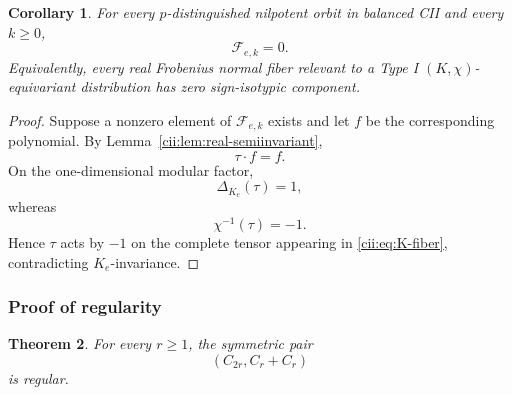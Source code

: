 \documentclass[11pt,reqno]{amsart}
\numberwithin{equation}{section}
\newtheorem{theorem}{Theorem}[section]
\newtheorem{corollary}[theorem]{Corollary}
\theoremstyle{definition}
\theoremstyle{remark}
\begin{document}
\begin{corollary}\label{cii:cor:no-sign-fiber}
For every \(p\)-distinguished nilpotent orbit in balanced CII and every
\(k\geq0\),
\[
\mathcal F_{e,k}=0.
\]
Equivalently, every real Frobenius normal fiber relevant to a Type I
\((K,\chi)\)-equivariant distribution has zero sign-isotypic component.
\end{corollary}

\begin{proof}
Suppose a nonzero element of \(\mathcal F_{e,k}\) exists and let \(f\) be
the corresponding polynomial.  By
Lemma~\ref{cii:lem:real-semiinvariant},
\[
\tau\cdot f=f.
\]
On the one-dimensional modular factor,
\[
\Delta_{K_e}(\tau)=1,
\]
whereas
\[
\chi^{-1}(\tau)=-1.
\]
Hence \(\tau\) acts by \(-1\) on the complete tensor appearing in
\eqref{cii:eq:K-fiber}, contradicting \(K_e\)-invariance.
\end{proof}


\subsubsection{Proof of regularity}

\begin{theorem}\label{cii:thm:regular}
For every \(r\geq1\), the symmetric pair
\[
(C_{2r},C_r+C_r)
\]
is regular.
\end{theorem}
\end{document}
